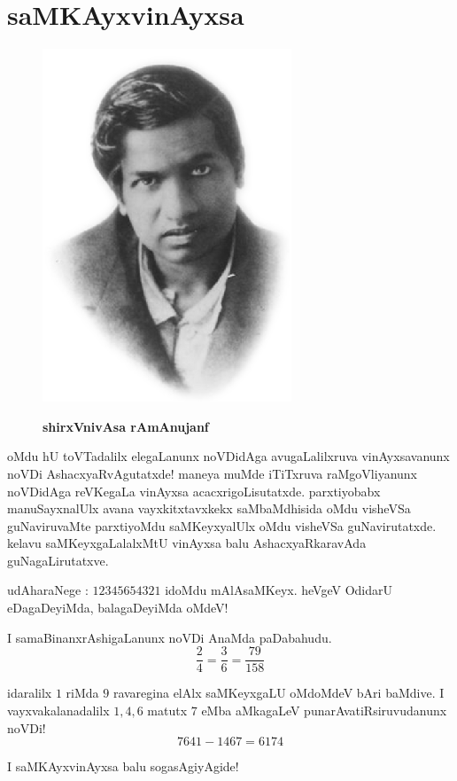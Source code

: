 \chapter{saMKAyxvinAyxsa}


\begin{figure}
  \centering\includegraphics{src/figures/Ramanujan.eps}
  
  {\bf shirxVnivAsa rAmAnujanf}
    \end{figure}
    
    
oMdu hU toVTadalilx elegaLanunx noVDi\-dAga avugaLalilxruva vinAyxsavanunx noVDi AshacxyaRvAgutatxde! maneya muMde iTiTxruva raMgoVliyanunx noVDidAga reVKegaLa vinAyxsa acacxrigoLisutatxde. parxtiyobabx manuSayxnalUlx avana vayxkitxtavxkekx saMbaMdhisida oMdu visheVSa guNaviruvaMte parxtiyoMdu saMKeyxyalUlx oMdu visheVSa guNavirutatxde. kelavu saMKeyxgaLalalxMtU vinAyxsa balu AshacxyaRkaravAda guNagaLirutatxve. 

udAharaNege : $12345654321$ idoMdu mAlAsaMKeyx. heVgeV OdidarU eDagaDeyiMda, balagaDeyiMda oMdeV!

I samaBinanxrAshigaLanunx noVDi AnaMda paDabahudu.
$$
\frac{2}{4} = \frac{3}{6} = \frac{79}{158}
$$

idaralilx $1$ riMda $9$ ravaregina elAlx saMKeyxgaLU oMdoMdeV bAri baMdive. I vayxvakalanadalilx $1, 4, 6$ matutx $7$ eMba aMkagaLeV punarAvatiRsiruvudanunx noVDi!
$$
7641-1467 = 6174
$$

I saMKAyxvinAyxsa balu sogasAgiyAgide!

\eject

